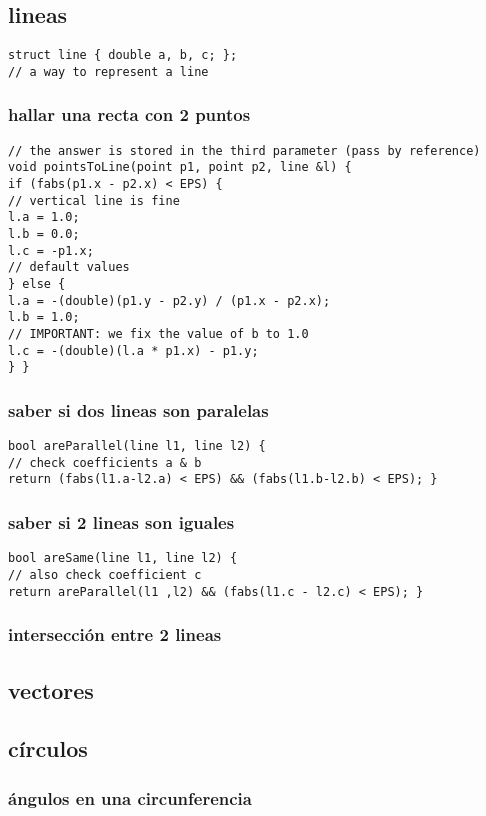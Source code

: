 \documentclass[11pt,a4paper]{book}
\begin{document}
\subsection{lineas}
\begin{lstlisting}[style=C]
struct line { double a, b, c; };
// a way to represent a line
\end{lstlisting}
\subsubsection{hallar una recta con 2 puntos}
\begin{lstlisting}[style=C]
// the answer is stored in the third parameter (pass by reference)
void pointsToLine(point p1, point p2, line &l) {
if (fabs(p1.x - p2.x) < EPS) {
// vertical line is fine
l.a = 1.0;
l.b = 0.0;
l.c = -p1.x;
// default values
} else {
l.a = -(double)(p1.y - p2.y) / (p1.x - p2.x);
l.b = 1.0;
// IMPORTANT: we fix the value of b to 1.0
l.c = -(double)(l.a * p1.x) - p1.y;
} }
\end{lstlisting}
\subsubsection{saber si dos lineas son paralelas}
\begin{lstlisting}[style=C]
bool areParallel(line l1, line l2) {
// check coefficients a & b
return (fabs(l1.a-l2.a) < EPS) && (fabs(l1.b-l2.b) < EPS); }
\end{lstlisting}
\subsubsection{saber si 2 lineas son iguales}
\begin{lstlisting}[style=C]
bool areSame(line l1, line l2) {
// also check coefficient c
return areParallel(l1 ,l2) && (fabs(l1.c - l2.c) < EPS); }
\end{lstlisting}
\subsubsection{intersección entre 2 lineas}
\subsection{vectores}
\subsection{círculos}
\subsubsection{ángulos en una circunferencia}
\end{document}
